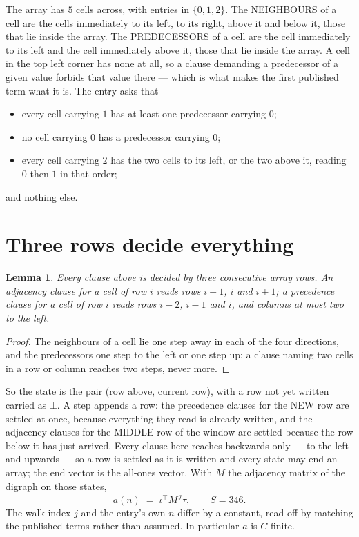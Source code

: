 \documentclass[11pt,a4paper]{article}
\theoremstyle{plain}
\newtheorem{lemma}[theorem]{Lemma}
\theoremstyle{definition}
\begin{document}
The array has $5$ cells across, with entries in $\{0,1,2\}$. The NEIGHBOURS of a cell are the
cells immediately to its left, to its right, above it and below it, those that lie inside the
array. The PREDECESSORS of a cell are the cell immediately to its left and the cell
immediately above it, those that lie inside the array. A cell in the top left corner has none
at all, so a clause demanding a predecessor of a given value forbids that value there --- which
is what makes the first published term what it is. The entry asks that
\begin{itemize}
\item every cell carrying $1$ has at least one predecessor carrying $0$;
\item no cell carrying $0$ has a predecessor carrying $0$;
\item every cell carrying $2$ has the two cells to its left, or the two above it, reading $0$ then $1$ in that order;
\end{itemize}
and nothing else.

\section{Three rows decide everything}

\begin{lemma}\label{lem:win}
Every clause above is decided by three consecutive array rows. An adjacency clause for a cell
of row $i$ reads rows $i-1$, $i$ and $i+1$; a precedence clause for a cell of row $i$ reads
rows $i-2$, $i-1$ and $i$, and columns at most two to the left.
\end{lemma}

\begin{proof}
The neighbours of a cell lie one step away in each of the four directions, and the predecessors
one step to the left or one step up; a clause naming two cells in a row or column reaches two
steps, never more.
\end{proof}

So the state is the pair (row above, current row), with a row not yet written carried as
$\bot$. A step appends a row: the precedence clauses for the NEW row are settled at once,
because everything they read is already written, and the adjacency clauses for the MIDDLE row
of the window are settled because the row below it has just arrived. Every clause here reaches backwards only --- to the left and upwards --- so a
row is settled as it is written and every state may end an array; the end vector is the
all-ones vector. With $M$ the
adjacency matrix of the digraph on those states,
\[
a(n)\;=\;\iota^{\!\top}M^{\,j}\tau ,\qquad S=346.
\]
The walk index $j$ and the entry's own $n$ differ by a constant, read off by matching the
published terms rather than assumed. In particular $a$ is $C$-finite.
\end{document}
